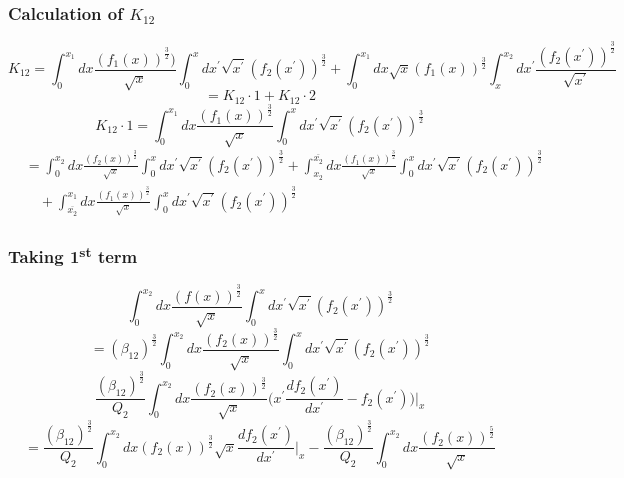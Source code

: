 \documentclass[fleqn, 10pt]{article}
\begin{document}
\subsubsection{Calculation of $K_{12}$}
\begin{equation}
    K_{12} = \int^{x_{1}}_{0} dx \frac{(f_{1}(x))^\frac{3}{2})}{\sqrt{x}} \int^{x}_{0} dx^\prime \sqrt{x^\prime} (f_{2}(x^\prime))^\frac{3}{2} + \int^{x_{1}}_{0} dx \sqrt{x} (f_{1}(x))^\frac{3}{2} \int^{x_{2}}_{x}dx^\prime \frac{(f_{2}(x^\prime))^\frac{3}{2}}{\sqrt{x^\prime}}
\end{equation}
\[ = K_{12}\cdot1 + K_{12} \cdot 2 \] 
\begin{equation}
    K_{12}\cdot 1 = \int^{x_{1}}_{0}dx \frac{(f_{1}(x))^\frac{3}{2}}{\sqrt{x}} \int^{x}_{0}dx^\prime \sqrt{x^\prime} (f_{2}(x^\prime))^\frac{3}{2}
\end{equation}
\begin{equation}
\begin{split}
   & = \int^{x_{2}}_{0} dx \frac{(f_{2}(x))^\frac{3}{2}}{\sqrt{x}} \int^{x}_{0} dx^\prime \sqrt{x^\prime} (f_{2}(x^\prime))^\frac{3}{2} + \int^{\overline{x_{2}}}_{x_{2}}dx \frac{(f_{1}(x))^\frac{3}{2}}{\sqrt{x}} \int^{x}_{0} dx^\prime \sqrt{x^\prime} (f_{2}(x^\prime))^\frac{3}{2} \\ & \quad + \int^{x_{1}}_{\overline{x_{2}}}dx \frac{(f_{1}(x))^\frac{3}{2}}{\sqrt{x}} \int^{x}_{0}dx^\prime \sqrt{x^\prime} (f_{2}(x^\prime))^\frac{3}{2}
    \end{split}
\end{equation}
\subsubsection*{Taking 1\textsuperscript{st} term}
\begin{equation*}
    \int^{x_{2}}_{0} dx \frac{(f(x))^\frac{3}{2}}{\sqrt{x}}\int^{x}_{0} dx^{\prime} \sqrt{x^{\prime}} (f_{2}(x^\prime))^\frac{3}{2}
\end{equation*}
\begin{equation*}
    =(\beta_{12})^\frac{3}{2} \int^{x_{2}}_{0} dx \frac{(f_{2}(x))^\frac{3}{2}}{\sqrt{x}} \int^{x}_{0}dx^\prime \sqrt{x^\prime} (f_{2}(x^\prime))^\frac{3}{2}
\end{equation*}
\begin{equation*}
    \frac{(\beta_{12})^\frac{3}{2}}{Q_{2}} \int^{x_{2}}_{0} dx \frac{(f_{2}(x))^\frac{3}{2}}{\sqrt{x}} \bigl( x^\prime \frac{df_{2}(x^\prime)}{dx^\prime} - f_{2}(x^\prime)\biggr)\biggr|_{x}
\end{equation*}
\begin{equation}
    =\frac{(\beta_{12})^\frac{3}{2}}{Q_{2}}\int^{x_{2}}_{0} dx (f_{2}(x))^\frac{3}{2} \sqrt{x} \frac{df_{2}(x^\prime)}{dx^\prime}\biggr|_{x} - \frac{(\beta_{12})^\frac{3}{2}}{Q_{2}}\int^{x_{2}}_{0} dx \frac{(f_{2}(x))^\frac{5}{2}}{\sqrt{x}}
\end{equation}
\end{document}
